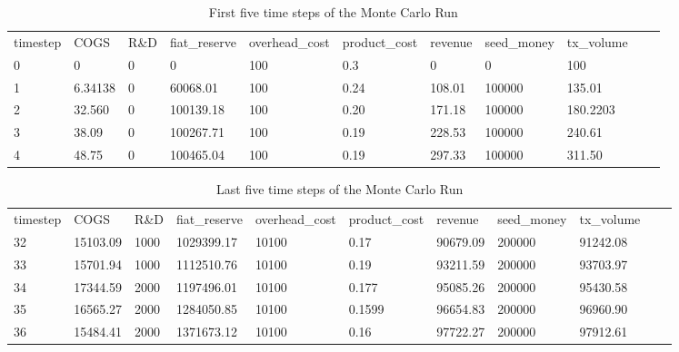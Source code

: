 \documentclass[12pt]{extarticle}
\begin{document}
\begin{table}[h]
	\centering
	\begin{adjustbox}{max width=\textwidth}
	\begin{tabular}{lllllllllll}
		\toprule
		timestep & COGS             & R\&D & fiat\_reserve & overhead\_cost & product\_cost     & revenue   & seed\_money & tx\_volume \\
		0        & 0                & 0    & 0             & 100            & 0.3               & 0          & 0           & 100        \\
		1        & 6.34138          & 0    & 60068.01   & 100            & 0.24            & 108.01  & 100000      & 135.01   \\
		2        & 32.560         & 0    & 100139.18  & 100            & 0.20            & 171.18 & 100000      & 180.2203   \\
		3        & 38.09 & 0    & 100267.71  & 100            & 0.19 & 228.53  & 100000      & 240.61   \\
		4        & 48.75 & 0    & 100465.04  & 100            & 0.19            & 297.33  & 100000      & 311.50  
	\end{tabular}
\end{adjustbox}
\caption{First five time steps of the Monte Carlo Run}
\label{table:FirstFive}
\end{table}

\begin{table}[h]
	\centering
	\begin{adjustbox}{max width=\textwidth}
	\begin{tabular}{lllllllllll}
		\toprule
		timestep & COGS        & R\&D & fiat\_reserve & overhead\_cost & product\_cost & revenue          & seed\_money & tx\_volume       \\
		32       & 15103.09 & 1000 & 1029399.17 & 10100          & 0.17        & 90679.09 & 200000         & 91242.08 \\
		33       & 15701.94 & 1000 & 1112510.76 & 10100          & 0.19        & 93211.59 & 200000       & 93703.97 \\
		34       & 17344.59 & 2000 & 1197496.01 & 10100          & 0.177        & 95085.26 & 200000       & 95430.58 \\
		35       & 16565.27 & 2000 & 1284050.85 & 10100          & 0.1599        & 96654.83 & 200000       & 96960.90 \\
		36       & 15484.41 & 2000 & 1371673.12 & 10100          & 0.16        & 97722.27      & 200000       & 97912.61
	\end{tabular}
\end{adjustbox}
\caption{Last five time steps of the Monte Carlo Run}
\label{table:LastFive}
\end{table}
\noindent
\end{document}
